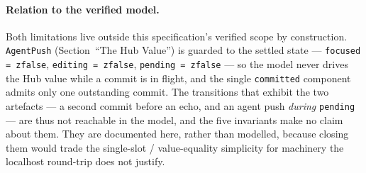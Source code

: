\documentclass[a4paper,10pt,fleqn]{article}
\begin{document}
\paragraph{Relation to the verified model.}
Both limitations live outside this specification's verified scope by
construction.  \texttt{AgentPush} (Section~``The Hub Value'') is guarded to the
settled state --- \texttt{focused = zfalse}, \texttt{editing = zfalse},
\texttt{pending = zfalse} --- so the model never drives the Hub value while a
commit is in flight, and the single \texttt{committed} component admits only one
outstanding commit.  The transitions that exhibit the two artefacts --- a second
commit before an echo, and an agent push \emph{during} \texttt{pending} --- are
thus not reachable in the model, and the five invariants make no claim about
them.  They are documented here, rather than modelled, because closing them would
trade the single-slot / value-equality simplicity for machinery the localhost
round-trip does not justify.
\end{document}
